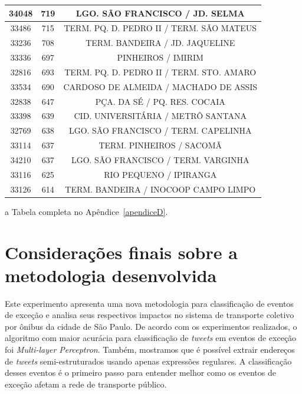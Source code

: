 \documentclass[
	12pt,				%
	oneside,			%
	a4paper,			%
	english,			%
	brazil				%
	]{abntex2ppgsi}
\begin{document}
{{\begin {table} [!htb]
{\begin{threeparttable}
\begin {tabular} {c|c|c}
    34048 & 719   & LGO. SÃO FRANCISCO / JD. SELMA  \\
\hline

    33486 & 715   & TERM. PQ. D. PEDRO II / TERM. SÃO MATEUS  \\
\hline

    33236 & 708   & TERM. BANDEIRA / JD. JAQUELINE  \\
\hline

    33336 & 697   & PINHEIROS / IMIRIM  \\
\hline

    32816 & 693   & TERM. PQ. D. PEDRO II / TERM. STO. AMARO  \\
\hline

    33534 & 690   & CARDOSO DE ALMEIDA / MACHADO DE ASSIS  \\
\hline

    32838 & 647   & PÇA. DA SÉ / PQ. RES. COCAIA  \\
\hline

    33398 & 639   & CID. UNIVERSITÁRIA / METRÔ SANTANA  \\
\hline

    32769 & 638   & LGO. SÃO FRANCISCO / TERM. CAPELINHA  \\
\hline

    33114 & 637   & TERM. PINHEIROS / SACOMÃ  \\
\hline

    34210 & 637   & LGO. SÃO FRANCISCO / TERM. VARGINHA  \\
\hline

    33116 & 625   & RIO PEQUENO / IPIRANGA  \\
\hline

    33126 & 614   & TERM. BANDEIRA / INOCOOP CAMPO LIMPO  \\
\bottomrule
\end{tabular}
\begin{tablenotes}
            \item[a] Tabela completa no Apêndice~\ref{apendiceD}.
        \end{tablenotes}
\end{threeparttable}
}
\end{table}

\section{Considerações finais sobre a metodologia desenvolvida}

Este experimento apresenta uma nova metodologia para classificação de eventos de exceção e analisa seus respectivos impactos no sistema de transporte coletivo por ônibus da cidade de São Paulo. De acordo com os experimentos realizados, o algoritmo com maior  acurácia para classificação de \textit{tweets} em eventos de exceção foi \textit{Multi-layer Perceptron}. Também, mostramos que é possível extrair endereços de \textit{tweets} semi-estruturados usando apenas expressões regulares. A classificação desses eventos é o primeiro passo para entender melhor como os eventos de exceção afetam a rede de transporte público.

}}
\end{document}
